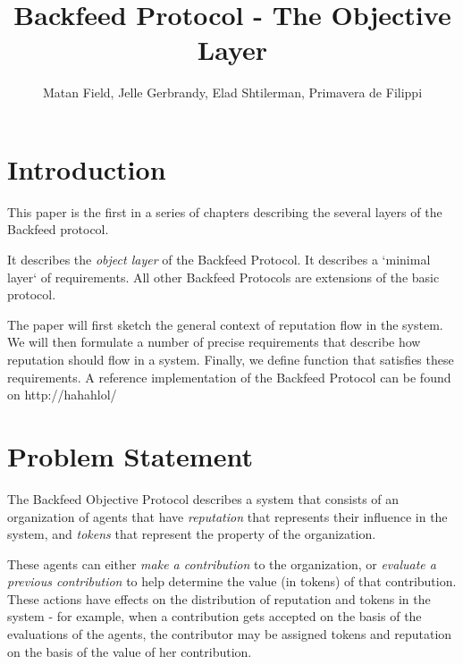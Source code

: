 \documentclass{article}
\begin{document}
\newcommand{\flow}{\Phi}
\newenvironment{condition}[1]
	{
	\begin{center}
	   \begin{tabular}{|p{0.9\textwidth}|}
		\hline\\
		{\bf #1:}\\
	}
	{
		\\ \\\hline
	\end{tabular}
	\end{center}
	}
    
\title{Backfeed Protocol - The Objective Layer}
\author{Matan Field, Jelle Gerbrandy, Elad Shtilerman, Primavera de Filippi}
\date{}
\maketitle

\tableofcontents

\section{Introduction}

This paper is the first in a series of chapters describing the several layers of the Backfeed protocol. 

It describes the {\em object layer} of the Backfeed Protocol. It describes a `minimal layer` of requirements. All other Backfeed Protocols are extensions of the basic protocol.

The paper will first sketch the general context of reputation flow in the system. 
We will then formulate a number of precise requirements that describe how reputation should flow in a system. Finally, we define function that satisfies these requirements. 
A reference implementation of the Backfeed Protocol can be found on http://hahahlol/

\section{Problem Statement}

The Backfeed Objective Protocol describes a system that consists of an organization of agents that have {\em reputation} that represents their influence in the system, and {\em tokens} that represent the property of the organization.

These agents can either {\em make a contribution} to the organization, or {\em evaluate a previous contribution} to help determine the value (in tokens) of that contribution. These actions have effects on the distribution of reputation and tokens in the system - for example, when a contribution gets accepted on the basis of the evaluations of the agents, the contributor may be assigned tokens and reputation on the basis of the value of her contribution.
\end{document}
